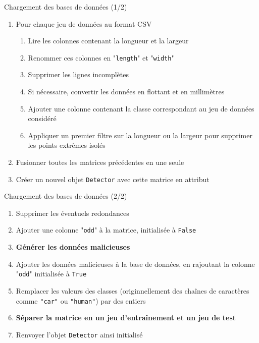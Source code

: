 \documentclass{beamer}
\begin{document}
\begin{frame}{Chargement des bases de données (1/2)}

\begin{enumerate}
\item Pour chaque jeu de données au format CSV
\begin{enumerate}[{1.}1.]
\item Lire les colonnes contenant la longueur et la largeur
\item Renommer ces colonnes en "\texttt{length}" et "\texttt{width}"
\item Supprimer les lignes incomplètes
\item Si nécessaire, convertir les données en flottant et en millimètres
\item Ajouter une colonne contenant la classe correspondant au jeu de données considéré
\item Appliquer un premier filtre sur la longueur ou la largeur pour supprimer les points extrêmes isolés
\end{enumerate}
\item Fusionner toutes les matrices précédentes en une seule
\item Créer un nouvel objet \texttt{Detector} avec cette matrice en attribut
\end{enumerate}

\end{frame}

\begin{frame}{Chargement des bases de données (2/2)}
\begin{enumerate}
\item Supprimer les éventuels redondances
\item Ajouter une colonne "\texttt{odd}" à la matrice, initialisée à \texttt{False}
\item \textbf{Générer les données malicieuses}
\item Ajouter les données malicieuses à la base de données, en rajoutant la colonne "\texttt{odd}" initialisée à \texttt{True}
\item Remplacer les valeurs des classes (originnellement des chaînes de caractères comme \texttt{"car"} ou \texttt{"human"}) par des entiers
\item \textbf{Séparer la matrice en un jeu d'entraînement et un jeu de test}
\item Renvoyer l'objet \texttt{Detector} ainsi initialisé
\end{enumerate}
\end{frame}
\end{document}
